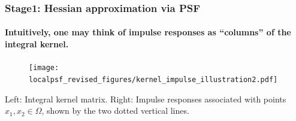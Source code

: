 \documentclass[10pt,final,xcolor=dvipsnames]{beamer}
\newcommand{\Aop}{\mathcal{A}}
\begin{document}
\begin{frame}
  \frametitle{Stage1: Hessian approximation via PSF}
  \framesubtitle{Intuitively, one may think of
    impulse responses as ``columns'' of the integral kernel.}

  \begin{figure}
    \begin{center}
      \texttt{[image: localpsf\_revised\_figures/kernel\_impulse\_illustration2.pdf]}
    \end{center}
  \end{figure}

  \begin{center}
    Left: Integral kernel matrix. Right: Impulse responses associated
    with points $x_1,x_2\in \Omega$, shown by the two dotted vertical
    lines.
  \end{center}
\end{frame}
\end{document}
